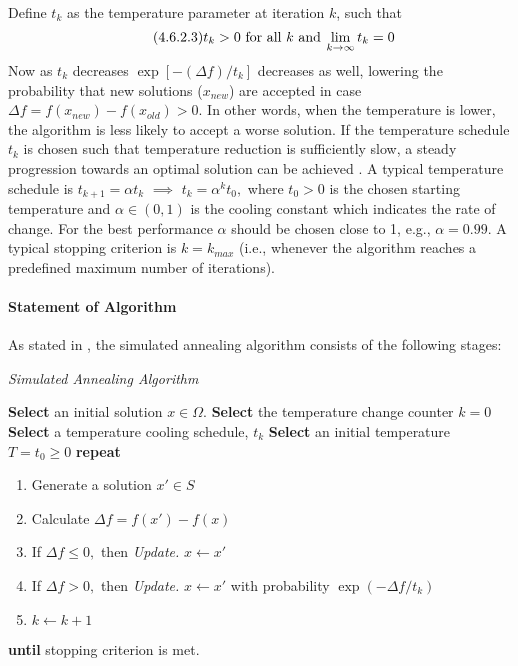 Define $t_{k}$ as the temperature parameter at iteration $k$, such that
\begin{equation}\tag{4.6.2.3}
t_k > 0 \hspace{0.33em}\text{for all}\hspace{0.33em} k \hspace{0.33em}\text{and}\hspace{0.23em}\lim_{k\rightarrow\infty}t_{k} = 0
\end{equation}
Now as $t_{k}$ decreases $\exp\left[-\left(\Delta f\right)/t_{k}\right]$ decreases as well, lowering the probability that new solutions ($x_{new}$) are accepted in case  $\Delta f = f(x_{new})-f(x_{old}) > 0.$ In other words, when the temperature is lower, the algorithm is less likely to accept a worse solution. If the temperature schedule $t_{k}$ is chosen such that temperature reduction is sufficiently slow, a steady progression towards an optimal solution can be achieved \cite[289]{Henderson2003}. A typical temperature schedule is $t_{k+1} = \alpha t_{k}$ $\implies$ $t_{k} = \alpha^{k} t_{0},$ where $t_{0} > 0$ is the chosen starting temperature and $\alpha \in (0, 1)$ is the cooling constant which indicates the rate of change. For the best performance $\alpha$ should be chosen close to 1, e.g., $\alpha=0.99.$ A typical stopping criterion is $k = k_{max}$ (i.e., whenever the algorithm reaches a predefined maximum number of iterations).
\paragraph{Statement of Algorithm}
As stated in \cite[290]{Henderson2003}, the simulated annealing algorithm consists of the following stages:
\begin{algorithm}
\caption{\textit{Simulated Annealing Algorithm}}\label{Pseudocode_SA}
\begin{algorithmic}
\State \textbf{Select} an initial solution $x \in \Omega$.
\State \textbf{Select} the temperature change counter $k=0$
\State \textbf{Select} a temperature cooling schedule, $t_{k}$ 
\State \textbf{Select} an initial temperature $T = t_{0} \geq 0$ 
\vspace{0.03cm}
\State \textbf{repeat}\\
\begin{enumerate}
    \item Generate a solution $x'\in S$ 
    \item Calculate $\Delta f = f(x')-f(x)$
    \item If $\Delta f \leq 0,$ then \textit{Update.} $x \leftarrow x'$
    \item If $\Delta f > 0,$ then \textit{Update.} $x \leftarrow x'$ with probability $\exp(-\Delta f / t_{k})$
    \item $k \leftarrow k + 1$
\end{enumerate}
\State \textbf{until} stopping criterion is met.
\end{algorithmic}
\end{algorithm}\\
\newpage
